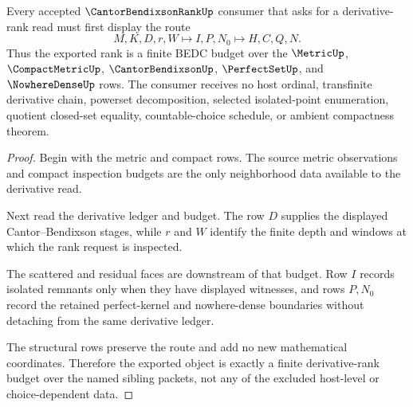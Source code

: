 \begin{theorem}
\label{thm:cantor-bendixson-rank-finite-derivative-budget}
Every accepted $\CantorBendixsonRankUp$ consumer that asks for a derivative-rank read must first display the route
$$
M,K,D,r,W \longmapsto I,P,N_0 \longmapsto H,C,Q,N .
$$
Thus the exported rank is a finite BEDC budget over the $\MetricUp$, $\CompactMetricUp$, $\CantorBendixsonUp$, $\PerfectSetUp$, and $\NowhereDenseUp$ rows. The consumer receives no host ordinal, transfinite derivative chain, powerset decomposition, selected isolated-point enumeration, quotient closed-set equality, countable-choice schedule, or ambient compactness theorem.
\end{theorem}
\begin{proof}
Begin with the metric and compact rows. The source metric observations and compact inspection budgets are the only neighborhood data available to the derivative read.

Next read the derivative ledger and budget. The row $D$ supplies the displayed Cantor--Bendixson stages, while $r$ and $W$ identify the finite depth and windows at which the rank request is inspected.

The scattered and residual faces are downstream of that budget. Row $I$ records isolated remnants only when they have displayed witnesses, and rows $P,N_0$ record the retained perfect-kernel and nowhere-dense boundaries without detaching from the same derivative ledger.

The structural rows preserve the route and add no new mathematical coordinates. Therefore the exported object is exactly a finite derivative-rank budget over the named sibling packets, not any of the excluded host-level or choice-dependent data.
\end{proof}




